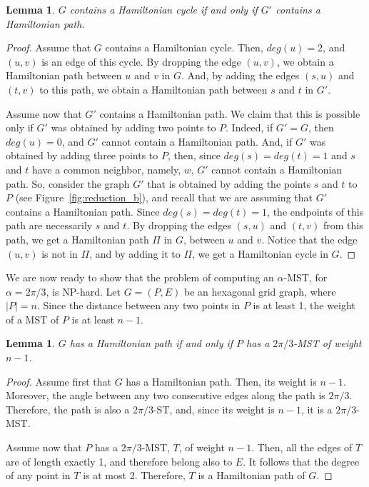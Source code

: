 \documentclass[11pt]{article}
\newtheorem{lemma}[theorem]{Lemma}
\begin{document}
{\begin{lemma}
$G$ contains a Hamiltonian cycle if and only if $G'$ contains a Hamiltonian path.
\end{lemma}
\begin{proof}
Assume that $G$ contains a Hamiltonian cycle. Then, $deg(u)= 2$, and $(u,v)$ is an edge of this cycle. By dropping the edge $(u,v)$, we obtain a Hamiltonian path between $u$ and $v$ in $G$. And, by adding the edges $(s,u)$ and $(t,v)$ to this path, we obtain a Hamiltonian path between $s$ and $t$ in $G'$. 

Assume now that $G'$ contains a Hamiltonian path. We claim that this is possible only if $G'$ was obtained by adding two points to $P$. Indeed, if $G'=G$, then $deg(u)=0$, and $G'$ cannot contain a Hamiltonian path. And, if $G'$ was obtained by adding three points to $P$, then, since $deg(s)=deg(t)=1$ and $s$ and $t$ have a common neighbor, namely, $w$, $G'$ cannot contain a Hamiltonian path. 
So, consider the graph $G'$ that is obtained by adding the points $s$ and $t$ to $P$ (see Figure~\ref{fig:reduction_b}), and recall that we are assuming that $G'$ contains a Hamiltonian path. Since $deg(s)=deg(t)=1$, the endpoints of this path are necessarily $s$ and $t$. By dropping the edges $(s,u)$ and $(t,v)$ from this path, we get a Hamiltonian path $\Pi$ in $G$, between $u$ and $v$. Notice that the edge $(u,v)$ is not in $\Pi$, and by adding it to $\Pi$, we get a Hamiltonian cycle in $G$. 
\end{proof}

We are now ready to show that the problem of computing an $\alpha$-MST, for $\alpha=2\pi/3$, is NP-hard.
Let $G=(P,E)$ be an hexagonal grid graph, where $|P|=n$. Since the distance between any two points in $P$ is at least 1, the weight of a MST of $P$ is at least $n-1$.
\begin{lemma}
$G$ has a Hamiltonian path if and only if $P$ has a $2\pi/3$-MST of weight $n-1$. 
\end{lemma}
\begin{proof}
Assume first that $G$ has a Hamiltonian path. Then, its weight is $n-1$. Moreover, the angle between any two consecutive edges along the path is $2\pi/3$. Therefore, the path is also a $2\pi/3$-ST, and, since its weight is $n-1$, it is a $2\pi/3$-MST.

Assume now that $P$ has a $2\pi/3$-MST, $T$, of weight $n-1$.
Then, all the edges of $T$ are of length exactly 1, and therefore belong also to $E$. It follows that the degree of any point in $T$ is at most 2. Therefore, $T$ is a Hamiltonian path of $G$. 
\end{proof}
}
\end{document}

